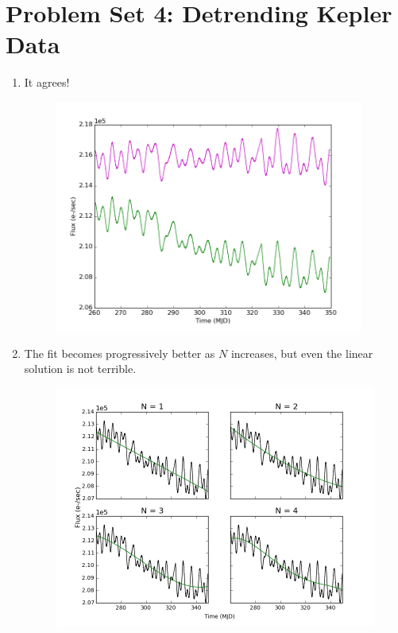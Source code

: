 \documentclass[10pt, preprint]{aastex}
\begin{document}
\section*{Problem Set 4: Detrending Kepler Data}
\begin{enumerate}
\item It agrees!
\begin{figure}[!ht]  \centering
  \includegraphics[width=4in]{hw4_fig1.png} %
\end{figure}

\item The fit becomes progressively better as $N$ increases, but even the linear solution is not terrible.
\begin{figure}[!ht]  \centering
  \includegraphics[width=5in]{hw4_fig2.png}
\end{figure}


\end{enumerate}
\end{document}
